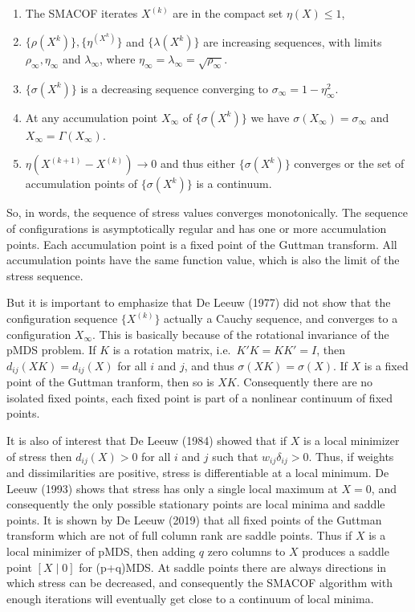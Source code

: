 \documentclass[
  12pt,
]{article}
\providecommand{\tightlist}{%
  \setlength{\itemsep}{0pt}\setlength{\parskip}{0pt}}
\begin{document}
\begin{enumerate}
\def\labelenumi{\arabic{enumi}.}
\tightlist
\item
  The SMACOF iterates \(X^{(k)}\) are in the compact set \(\eta(X)\leq 1\),
\item
  \(\{\rho(X^{k})\}, \{\eta^(X^{k})\}\) and \(\{\lambda(X^{k})\}\) are increasing sequences, with limits \(\rho_\infty,\eta_\infty\) and \(\lambda_\infty\), where \(\eta_\infty=\lambda_\infty=\sqrt{\rho_\infty}\).
\item
  \(\{\sigma(X^{k})\}\) is a decreasing sequence converging to \(\sigma_\infty=1-\eta^2_\infty\).
\item
  At any accumulation point \(X_\infty\) of \(\{\sigma(X^{k})\}\) we have \(\sigma(X_\infty)=\sigma_\infty\) and \(X_\infty=\Gamma(X_\infty)\).
\item
  \(\eta(X^{(k+1)}-X^{(k)})\rightarrow 0\) and thus either \(\{\sigma(X^{k})\}\) converges or the set of accumulation points of \(\{\sigma(X^{k})\}\) is a continuum.
\end{enumerate}

So, in words, the sequence of stress values converges monotonically. The sequence of configurations is asymptotically regular and has one or more accumulation points. Each accumulation point is a fixed point of the Guttman transform. All accumulation points have the same function value, which is also the limit of the stress sequence.

But it is important to emphasize that De Leeuw (1977) did not show that the configuration sequence \(\{X^{(k)}\}\) actually a Cauchy sequence, and converges to a configuration \(X_\infty\). This is basically because of the rotational invariance of the pMDS problem. If \(K\) is a rotation matrix, i.e.~\(K'K=KK'=I\), then \(d_{ij}(XK)=d_{ij}(X)\) for all \(i\) and \(j\), and thus \(\sigma(XK)=\sigma(X)\). If \(X\) is a fixed point of the Guttman tranform, then so is \(XK\).
Consequently there are no isolated fixed points, each fixed point is part of a nonlinear continuum of fixed points.

It is also of interest that De Leeuw (1984) showed that if \(X\) is a local minimizer of stress then \(d_{ij}(X)>0\) for all \(i\) and \(j\) such that \(w_{ij}\delta_{ij}>0\). Thus, if weights and dissimilarities are positive, stress is differentiable at a local minimum.
De Leeuw (1993) shows that stress has only a single local maximum at \(X=0\), and consequently the only possible stationary points are local minima and saddle points. It is shown by
De Leeuw (2019) that all fixed points of the Guttman transform which are not of full column rank are saddle points. Thus if \(X\) is a local minimizer of pMDS, then adding \(q\) zero columns to \(X\) produces a saddle point \([X\mid 0]\) for (p+q)MDS. At saddle points there are always directions in which stress can be decreased, and consequently the SMACOF algorithm with enough iterations will eventually get close to a continuum of local minima.
\end{document}

